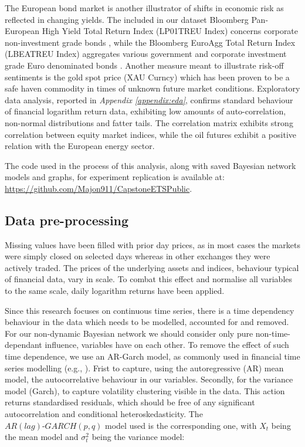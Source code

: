 \documentclass[12pt, letterpaper]{article}
\begin{document}
The European bond market is another illustrator of shifts in economic risk as reflected in changing yields. The included in our dataset Bloomberg Pan-European High Yield Total Return Index (LP01TREU Index) concerns corporate non-investment grade bonds \parencite{bloomberg2021}, while the Bloomberg EuroAgg Total Return Index (LBEATREU Index) aggregates various government and corporate investment grade Euro denominated bonds \parencite{bloomberg2023}. Another measure meant to illustrate risk-off sentiments is the gold spot price (XAU Curncy) which has been proven to be a safe haven commodity in times of unknown future market conditions. Exploratory data analysis, reported in \textit{Appendix \ref{appendix:eda}}, confirms standard behaviour of financial logarithm return data, exhibiting low amounts of auto-correlation, non-normal distributions and fatter tails. The correlation matrix exhibits strong correlation between equity market indices, while the oil futures exhibit a positive relation with the European energy sector.

The code used in the process of this analysis, along with saved Bayesian network models and graphs, for experiment replication is available at: \url{https://github.com/Majon911/CapstoneETSPublic}.

\subsection{Data pre-processing}

Missing values have been filled with prior day prices, as in most cases the markets were simply closed on selected days whereas in other exchanges they were actively traded. The prices of the underlying assets and indices, behaviour typical of financial data, vary in scale. To combat this effect and normalise all variables to the same scale, daily logarithm returns have been applied.

Since this research focuses on continuous time series, there is a time dependency behaviour in the data which needs to be modelled, accounted for and removed. For our non-dynamic Bayesian network we should consider only pure non-time-dependant influence, variables have on each other. To remove the effect of such time dependence, we use an AR-Garch model, as commonly used in financial time series modelling (e.g., \cite{ruppert2015}). Frist to capture, using the autoregressive (AR) mean model, the autocorrelative behaviour in our variables. Secondly, for the variance model (Garch), to capture volatility clustering visible in the data. This action returns standardised residuals, which should be free of any significant autocorrelation and conditional heteroskedasticity. The $AR(lag)\text{-}GARCH(p,q)$ model used is the corresponding one, with $X_t$ being the mean model and $\sigma_t^2$ being the variance model:
\end{document}
